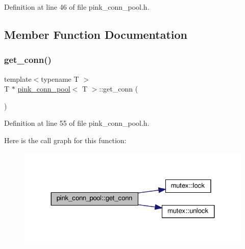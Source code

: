 Definition at line 46 of file pink\+\_\+conn\+\_\+pool.\+h.



\subsection{Member Function Documentation}
\mbox{\label{classpink__conn__pool_a1b053641006c7f00fd4764fea40f410c}} 
\subsubsection{\texorpdfstring{get\+\_\+conn()}{get\_conn()}}
{\footnotesize\ttfamily template$<$typename T $>$ \\
T $\ast$ \hyperlink{classpink__conn__pool}{pink\+\_\+conn\+\_\+pool}$<$ T $>$\+::get\+\_\+conn (\begin{DoxyParamCaption}{ }\end{DoxyParamCaption})}



Definition at line 55 of file pink\+\_\+conn\+\_\+pool.\+h.

Here is the call graph for this function\+:\nopagebreak
\begin{figure}[H]
\begin{center}
\leavevmode
\includegraphics[width=324pt]{classpink__conn__pool_a1b053641006c7f00fd4764fea40f410c_cgraph}
\end{center}
\end{figure}
\mbox{\label{classpink__conn__pool_a90965493d13fc28f0060ca6fed7d12a4}} 
